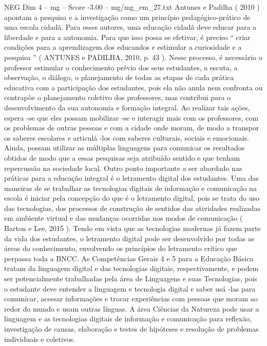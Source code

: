 \begin{textsample}{NEG Dim 4 – mg – Score -3.00 – mg/mg\_em\_27.txt}  \label{ex:f4_neg_092}
Antunes e Padilha ( 2010 ) apontam a pesquisa e a investigação como um princípio pedagógico-prático de uma escola cidadã.
Para esses autores, uma educação cidadã deve educar para a liberdade e para a autonomia.
Para que isso possa se efetivar, é preciso “ criar condições para a aprendizagem dos educandos e estimular a curiosidade e a pesquisa ” ( ANTUNES e PADILHA, 2010, p. 43 ).
Nesse processo, é necessário o professor estimular o conhecimento prévio dos seus estudantes, a escuta, a observação, o diálogo, o planejamento de todas as etapas de cada prática educativa com a participação dos estudantes, pois ela não anula nem confronta ou contrapõe o planejamento coletivo dos professores, mas contribui para o desenvolvimento da sua autonomia e formação integral.
Ao realizar tais ações, espera -se que eles possam mobilizar -se e interagir mais com os professores, com os problemas de outras pessoas e com a cidade onde moram, de modo a transpor os saberes escolares e articulá -los com saberes culturais, sociais e emocionais.
Ainda, possam utilizar as múltiplas linguagens para comunicar os resultados obtidos de modo que a essas pesquisas seja atribuído sentido e que tenham repercussão na sociedade local.
Outro ponto importante a ser abordado nas práticas para a educação integral é o letramento digital dos estudantes.
Uma das maneiras de se trabalhar as tecnologias digitais de informação e comunicação na escola é iniciar pela concepção do que é o letramento digital, pois se trata do uso das tecnologias, dos processos de construção de sentidos das atividades realizadas em ambiente virtual e das mudanças ocorridas nos modos de comunicação ( Barton e Lee, 2015 ).
Tendo em vista que as tecnologias modernas já fazem parte da vida dos estudantes, o letramento digital pode ser desenvolvido por todas as áreas do conhecimento, envolvendo os princípios do letramento crítico que perpassa toda a BNCC.
As Competências Gerais 4 e 5 para a Educação Básica tratam da linguagem digital e das tecnologias digitais, respectivamente, e podem ser potencialmente trabalhadas pela área de Linguagens e suas Tecnologias, pois o estudante deve entender a linguagem e tecnologia digital e saber usá -las para comunicar, acessar informações e trocar experiências com pessoas que moram ao redor do mundo e usam outras línguas.
A área Ciências da Natureza pode usar a linguagem e as tecnologias digitais de informação e comunicação para reflexão, investigação de causas, elaboração e testes de hipóteses e resolução de problemas individuais e coletivos.

\end{textsample}
